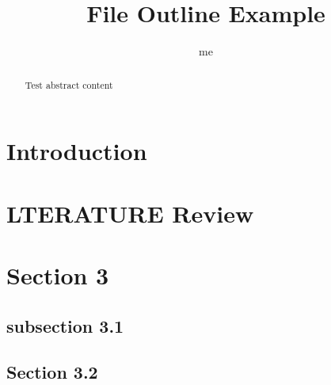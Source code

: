 \documentclass{article}
\title{File Outline Example}
\author{me}
\begin{document}
\maketitle

\begin{abstract}
Test abstract content
\end{abstract}

\section{Introduction}

\section{LTERATURE Review}\section{Section 3}
\subsection{subsection 3.1}
\subsection{Section 3.2}
\end{document}
